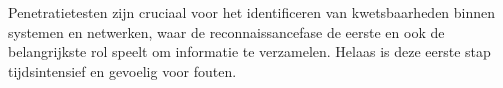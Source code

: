 
%
%
%
%
%

%



\chapter*{}

Penetratietesten zijn cruciaal voor het identificeren van kwetsbaarheden binnen systemen en netwerken, waar de reconnaissancefase de eerste en ook de belangrijkste rol speelt om informatie te verzamelen.
Helaas is deze eerste stap tijdsintensief en gevoelig voor fouten.\\

